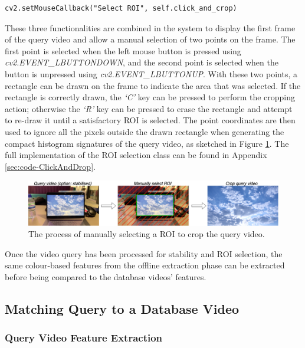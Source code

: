 \begin{lstlisting}[numbers=none]
cv2.setMouseCallback("Select ROI", self.click_and_crop)
\end{lstlisting}

These three functionalities are combined in the system to display the first frame of the query video and allow a manual selection of two points on the frame. The first point is selected when the left mouse button is pressed using \textit{cv2.EVENT\_LBUTTONDOWN}, and the second point is selected when the button is unpressed using \textit{cv2.EVENT\_LBUTTONUP}. With these two points, a rectangle can be drawn on the frame to indicate the area that was selected. If the rectangle is correctly drawn, the \textit{`C'} key can be pressed to perform the cropping action; otherwise the \textit{`R'} key can be pressed to erase the rectangle and attempt to re-draw it until a satisfactory ROI is selected. The point coordinates are then used to ignore all the pixels outside the drawn rectangle when generating the compact histogram signatures of the query video, as sketched in Figure \ref{fig:implementation-roi_selection}. The full implementation of the ROI selection class can be found in Appendix \ref{sec:code-ClickAndDrop}.\\

\begin{figure}[h] 
\centerline{\includegraphics[width=\textwidth]{figures/implementation/roi_selection.png}}
\caption{\label{fig:implementation-roi_selection}The process of manually selecting a ROI to crop the query video.}
\end{figure}

Once the video query has been processed for stability and ROI selection, the same colour-based features from the offline extraction phase can be extracted before being compared to the database videos' features.


\subsection{Matching Query to a Database Video}

\subsubsection{Query Video Feature Extraction}

